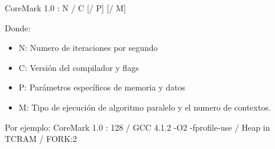 	CoreMark 1.0 : N / C [/ P] [/ M]
	
	Donde:
	\begin{itemize}
	\item N: Numero de iteraciones por segundo 
	\item C: Versión del compilador y flags
	\item P: Parámetros específicos de memoria y datos
	\item M: Tipo de ejecución de algoritmo paralelo y el numero de contextos.
	\end{itemize}	 
	
	Por ejemplo: CoreMark 1.0 : 128 / GCC 4.1.2 -O2 -fprofile-use / Heap in TCRAM / FORK:2
	
 	



